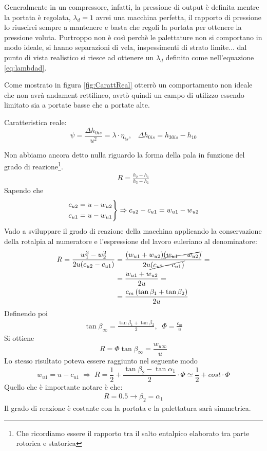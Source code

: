 Generalmente in un compressore, infatti, la pressione di output è definita mentre la portata è regolata, $\lambda_d = 1$ avrei una macchina perfetta, il rapporto di pressione lo riuscirei sempre a mantenere e basta che regoli la portata per ottenere la pressione voluta. Purtroppo non è così perchè le palettature non si comportano in modo ideale, si hanno separazioni di vela, inspessimenti di strato limite... dal punto di vista realistico si riesce ad ottenere un $\lambda_d$ definito come nell'equazione \ref{eq:lambdad}. 

Come mostrato in figura \ref{fig:CarattReal} otterrò un comportamento non ideale che non avrà andament rettilineo, avrtò quindi un campo di utilizzo essendo limitato sia a portate basse che a portate alte. 

Caratteristica reale:
\begin{equation}
\psi = \frac{\Delta h_{0is}}{u^2} = \lambda \cdot \eta_{is}, \;\;\; \Delta h_{0is} = h_{30is} - h_{10}
\end{equation}

Non abbiamo ancora detto nulla riguardo la forma della pala in funzione del grado di reazione\footnote{Che ricordiamo essere il rapporto tra il salto entalpico elaborato tra parte rotorica e statorica}. 
\begin{align*}
R = \frac{h_2 - h_1}{h_3-h_1} 
\end{align*}
Sapendo che
\begin{align*}
\begin{rcases*}
c_{u2} = u - w_{u2}\\
c_{u1} = u - w_{u1}
\end{rcases*}
\Rightarrow c_{u2} - c_{u1} = w_{u1} - w_{u2} 
\end{align*}
Vado a sviluppare il grado di reazione della macchina applicando la conservazione della rotalpia al numeratore e l'espressione del lavoro euleriano al denominatore:
\begin{align*}
R = \frac{w_1^2 - w_2^2}{2 u (c_{u2} - c_{u1})} &= \frac{(w_{u1} + w_{u2})\cancel{(w_{u1}-w_{u2})}}{2 u \cancel{(c_{u2} - c_{u1})}} =\\
&= \frac{w_{u1} + w_{u2}}{2u} = \\
&= \frac{c_m \left(\tan \beta_1 + \tan \beta_2 \right)}{2 u}
\end{align*}
Definendo poi
\begin{align*}
\tan \beta_{\infty} = \frac{\tan \beta_1 + \tan \beta_2}{2}, \;\; \Phi = \frac{c_m}{u}
\end{align*}
Si ottiene
\begin{equation}
\boxed{R = \Phi \tan \beta_{\infty} = \frac{w_{u \infty}}{u}}
\end{equation}
Lo stesso risultato poteva essere raggiunto nel seguente modo
\begin{equation}
w_{u1} = u - c_{u1} \; \Rightarrow \; R = \frac{1}{2} + \frac{\tan \beta_2 - \tan \alpha_1}{2} \cdot \Phi \simeq \frac{1}{2} + cost \cdot \Phi
\end{equation}
Quello che è importante notare è che:
\begin{align*}
R = 0.5 \to \beta_2 = \alpha_1
\end{align*}
Il grado di reazione è costante con la portata e la palettatura sarà simmetrica.

